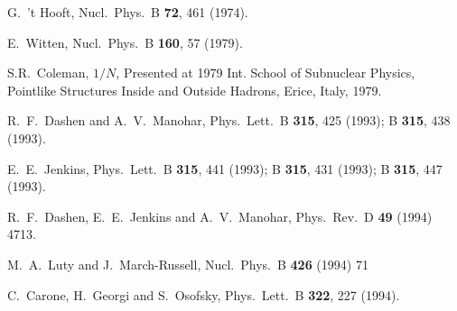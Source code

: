 \documentclass[twocolumn,nofootinbib,prd,aps,superscriptaddress,tightenlines]{revtex4}
\begin{document}
\begin{thebibliography}{99}

  G.~'t Hooft,
  Nucl.\ Phys.\  B {\bf 72}, 461 (1974).

  E.~Witten,
  Nucl.\ Phys.\  B {\bf 160}, 57 (1979).

S.R.~Coleman, $1/N$, Presented at 1979 Int. School of Subnuclear Physics, Pointlike Structures Inside and Outside Hadrons, Erice, Italy, 1979. 


  R.~F.~Dashen and A.~V.~Manohar,
  Phys.\ Lett.\  B {\bf 315}, 425 (1993);
 B {\bf 315}, 438 (1993).

  E.~E.~Jenkins,
  Phys.\ Lett.\  B {\bf 315}, 441 (1993);
 B {\bf 315}, 431 (1993);
 B {\bf 315}, 447 (1993).


  R.~F.~Dashen, E.~E.~Jenkins and A.~V.~Manohar,
  Phys.\ Rev.\  D {\bf 49} (1994) 4713.
  

  M.~A.~Luty and J.~March-Russell,
  Nucl.\ Phys.\  B {\bf 426} (1994) 71
  
  C.~Carone, H.~Georgi and S.~Osofsky,
  Phys.\ Lett.\  B {\bf 322}, 227 (1994).


\end{thebibliography}
\end{document}
